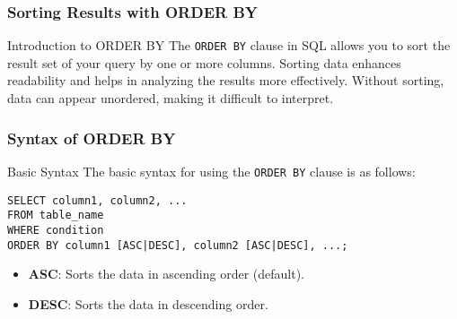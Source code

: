 \documentclass[aspectratio=169]{beamer}
\begin{document}
\begin{frame}[fragile]
    \frametitle{Sorting Results with ORDER BY}
    \begin{block}{Introduction to ORDER BY}
        The \texttt{ORDER BY} clause in SQL allows you to sort the result set of your query by one or more columns. Sorting data enhances readability and helps in analyzing the results more effectively. Without sorting, data can appear unordered, making it difficult to interpret.
    \end{block}
\end{frame}

\begin{frame}[fragile]
    \frametitle{Syntax of ORDER BY}
    \begin{block}{Basic Syntax}
        The basic syntax for using the \texttt{ORDER BY} clause is as follows:
        \begin{lstlisting}
SELECT column1, column2, ...
FROM table_name
WHERE condition
ORDER BY column1 [ASC|DESC], column2 [ASC|DESC], ...;
        \end{lstlisting}
    \end{block}
    
    \begin{itemize}
        \item \textbf{ASC}: Sorts the data in ascending order (default).
        \item \textbf{DESC}: Sorts the data in descending order.
    \end{itemize}
\end{frame}
\end{document}
